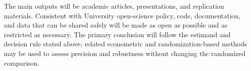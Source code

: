 \documentclass[11pt,a4paper]{article}
\begin{document}
The main outputs will be academic articles, presentations, and replication materials. Consistent with University open-science policy, code, documentation, and data that can be shared safely will be made as open as possible and as restricted as necessary. The primary conclusion will follow the estimand and decision rule stated above; related econometric and randomization-based methods may be used to assess precision and robustness without changing the randomized comparison.

\printbibliography
\end{document}
